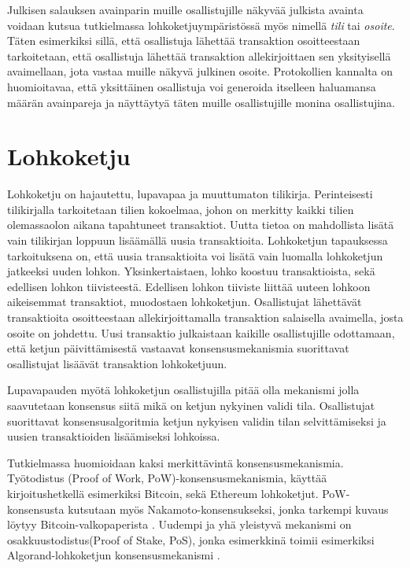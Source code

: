 Julkisen salauksen avainparin muille osallistujille näkyvää julkista avainta voidaan kutsua tutkielmassa lohkoketjuympäristössä myös nimellä \textit{tili} tai \textit{osoite}. Täten esimerkiksi sillä, että osallistuja lähettää transaktion osoitteestaan tarkoitetaan, että osallistuja lähettää transaktion allekirjoittaen sen yksityisellä avaimellaan, jota vastaa muille näkyvä julkinen osoite. Protokollien kannalta on huomioitavaa, että yksittäinen osallistuja voi generoida itselleen haluamansa määrän avainpareja ja näyttäytyä täten muille osallistujille monina osallistujina.

\section{Lohkoketju}

Lohkoketju on hajautettu, lupavapaa ja muuttumaton tilikirja. Perinteisesti tilikirjalla tarkoitetaan tilien kokoelmaa, johon on merkitty kaikki tilien olemassaolon aikana tapahtuneet transaktiot. Uutta tietoa on mahdollista lisätä vain tilikirjan loppuun lisäämällä uusia transaktioita. Lohkoketjun tapauksessa tarkoituksena on, että uusia  transaktioita voi lisätä vain luomalla lohkoketjun jatkeeksi uuden lohkon. Yksinkertaistaen, lohko koostuu transaktioista, sekä edellisen lohkon tiivisteestä. Edellisen lohkon tiiviste liittää uuteen lohkoon aikeisemmat transaktiot, muodostaen lohkoketjun. Osallistujat lähettävät transaktioita osoitteestaan allekirjoittamalla transaktion salaisella avaimella, josta osoite on johdettu. Uusi transaktio julkaistaan kaikille osallistujille odottamaan, että ketjun päivittämisestä vastaavat konsensusmekanismia suorittavat osallistujat lisäävät transaktion lohkoketjuun.

 Lupavapauden myötä lohkoketjun osallistujilla pitää olla mekanismi jolla saavutetaan konsensus siitä mikä on ketjun nykyinen validi tila. Osallistujat suorittavat konsensusalgoritmia ketjun nykyisen validin tilan selvittämiseksi ja uusien transaktioiden lisäämiseksi lohkoissa. 

Tutkielmassa huomioidaan kaksi merkittävintä konsensusmekanismia. Työtodistus (Proof of Work, PoW)-konsensusmekanismia, käyttää kirjoitushetkellä esimerkiksi Bitcoin, sekä Ethereum lohkoketjut. PoW-konsensusta kutsutaan myös Nakamoto-konsensukseksi, jonka tarkempi kuvaus löytyy Bitcoin-valkopaperista \cite{Nakamoto_bitcoin}. Uudempi ja yhä yleistyvä mekanismi on  osakkuustodistus(Proof of Stake, PoS), jonka esimerkkinä toimii esimerkiksi Algorand-lohkoketjun konsensusmekanismi \cite{gilad_algorand_2017}. 

